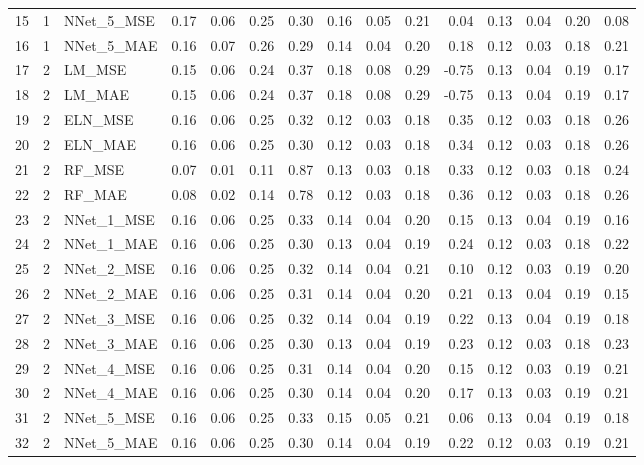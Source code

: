 \begin{table}[ht]
\begin{tabular}{rrlrrrrrrrrrrrr}
  15 &   1 & NNet\_5\_MSE & 0.17 & 0.06 & 0.25 & 0.30 & 0.16 & 0.05 & 0.21 & 0.04 & 0.13 & 0.04 & 0.20 & 0.08 \\ 
  16 &   1 & NNet\_5\_MAE & 0.16 & 0.07 & 0.26 & 0.29 & 0.14 & 0.04 & 0.20 & 0.18 & 0.12 & 0.03 & 0.18 & 0.21 \\ 
  17 &   2 & LM\_MSE & 0.15 & 0.06 & 0.24 & 0.37 & 0.18 & 0.08 & 0.29 & -0.75 & 0.13 & 0.04 & 0.19 & 0.17 \\ 
  18 &   2 & LM\_MAE & 0.15 & 0.06 & 0.24 & 0.37 & 0.18 & 0.08 & 0.29 & -0.75 & 0.13 & 0.04 & 0.19 & 0.17 \\ 
  19 &   2 & ELN\_MSE & 0.16 & 0.06 & 0.25 & 0.32 & 0.12 & 0.03 & 0.18 & 0.35 & 0.12 & 0.03 & 0.18 & 0.26 \\ 
  20 &   2 & ELN\_MAE & 0.16 & 0.06 & 0.25 & 0.30 & 0.12 & 0.03 & 0.18 & 0.34 & 0.12 & 0.03 & 0.18 & 0.26 \\ 
  21 &   2 & RF\_MSE & 0.07 & 0.01 & 0.11 & 0.87 & 0.13 & 0.03 & 0.18 & 0.33 & 0.12 & 0.03 & 0.18 & 0.24 \\ 
  22 &   2 & RF\_MAE & 0.08 & 0.02 & 0.14 & 0.78 & 0.12 & 0.03 & 0.18 & 0.36 & 0.12 & 0.03 & 0.18 & 0.26 \\ 
  23 &   2 & NNet\_1\_MSE & 0.16 & 0.06 & 0.25 & 0.33 & 0.14 & 0.04 & 0.20 & 0.15 & 0.13 & 0.04 & 0.19 & 0.16 \\ 
  24 &   2 & NNet\_1\_MAE & 0.16 & 0.06 & 0.25 & 0.30 & 0.13 & 0.04 & 0.19 & 0.24 & 0.12 & 0.03 & 0.18 & 0.22 \\ 
  25 &   2 & NNet\_2\_MSE & 0.16 & 0.06 & 0.25 & 0.32 & 0.14 & 0.04 & 0.21 & 0.10 & 0.12 & 0.03 & 0.19 & 0.20 \\ 
  26 &   2 & NNet\_2\_MAE & 0.16 & 0.06 & 0.25 & 0.31 & 0.14 & 0.04 & 0.20 & 0.21 & 0.13 & 0.04 & 0.19 & 0.15 \\ 
  27 &   2 & NNet\_3\_MSE & 0.16 & 0.06 & 0.25 & 0.32 & 0.14 & 0.04 & 0.19 & 0.22 & 0.13 & 0.04 & 0.19 & 0.18 \\ 
  28 &   2 & NNet\_3\_MAE & 0.16 & 0.06 & 0.25 & 0.30 & 0.13 & 0.04 & 0.19 & 0.23 & 0.12 & 0.03 & 0.18 & 0.23 \\ 
  29 &   2 & NNet\_4\_MSE & 0.16 & 0.06 & 0.25 & 0.31 & 0.14 & 0.04 & 0.20 & 0.15 & 0.12 & 0.03 & 0.19 & 0.21 \\ 
  30 &   2 & NNet\_4\_MAE & 0.16 & 0.06 & 0.25 & 0.30 & 0.14 & 0.04 & 0.20 & 0.17 & 0.13 & 0.03 & 0.19 & 0.21 \\ 
  31 &   2 & NNet\_5\_MSE & 0.16 & 0.06 & 0.25 & 0.33 & 0.15 & 0.05 & 0.21 & 0.06 & 0.13 & 0.04 & 0.19 & 0.18 \\ 
  32 &   2 & NNet\_5\_MAE & 0.16 & 0.06 & 0.25 & 0.30 & 0.14 & 0.04 & 0.19 & 0.22 & 0.12 & 0.03 & 0.19 & 0.21 \\ 

\end{tabular}
\end{table}
